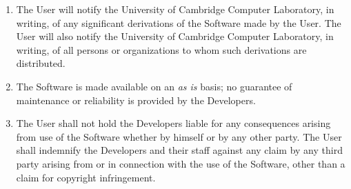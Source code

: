 \begin{titlepage}
\begin{enumerate}
\item The User will notify the University of Cambridge Computer
Laboratory, in writing, of any significant derivations of
the Software made by
the User. The User will also notify the University of Cambridge Computer
Laboratory, in writing, of all persons or organizations to whom such
derivations are distributed.

\item The Software is made available on an {\it as is\/} basis; no guarantee
of maintenance or reliability is provided by the Developers.

\item The User shall not hold the Developers
liable for any consequences arising from use of the
Software whether by himself or by any other party.
The User shall indemnify the Developers and their staff against any claim by
any third party arising from or in connection with the use of the Software,
other than a claim for copyright infringement.
\end{enumerate}


\bigskip

\dotfill\mbox{}

\bigskip

\dotfill\mbox{}

\bigskip

\dotfill\mbox{}


\end{titlepage}




